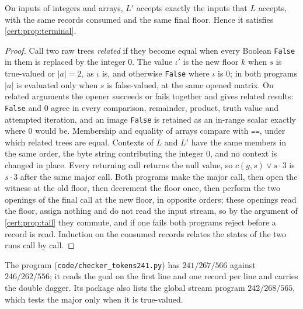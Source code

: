 \begin{proposition}\label{cert:prop:tuple-stream}
On inputs of integers and arrays, $L'$ accepts exactly the inputs that $L$
accepts, with the same records consumed and the same final floor. Hence it
satisfies \cref{cert:prop:terminal}.
\end{proposition}
\begin{proof}
Call two raw trees \emph{related} if they become equal when every Boolean
\texttt{False} in them is replaced by the integer $0$. The value $\iota'$ is the
new floor $k$ when $s$ is true-valued or $\lvert a\rvert=2$, as $\iota$ is, and
otherwise \texttt{False} where $\iota$ is $0$; in both programs $\lvert a\rvert$
is evaluated only when $s$ is false-valued, at the same opened matrix. On
related arguments the opener succeeds or fails together and gives related
results: \texttt{False} and $0$ agree in every comparison, remainder, product,
truth value and attempted iteration, and an image \texttt{False} is retained as
an in-range scalar exactly where $0$ would be. Membership and equality of
arrays compare with \texttt{==}, under which related trees are equal. Contexts
of $L$ and $L'$ have the same members in the same order, the byte string
contributing the integer $0$, and no context is changed in place. Every
returning call returns the null value, so $c(g,s)\lor s\cdot 3$ is
$s\cdot 3$ after the same major call. Both programs make the major call, then
open the witness at the old floor, then decrement the floor once, then perform
the two openings of the final call at the new floor, in opposite orders; these
openings read the floor, assign nothing and do not read the input stream, so by
the argument of \cref{cert:prop:tail} they commute, and if one fails both
programs reject before a record is read. Induction on the consumed records
relates the states of the two runs call by call.
\end{proof}

The program (\texttt{code/checker\_tokens241.py}) has $241/267/566$ against
$246/262/556$; it reads the goal on the first line and one record per line and
carries the double dagger. Its package also lists the global stream program
$242/268/565$, which tests the major only when it is true-valued.

